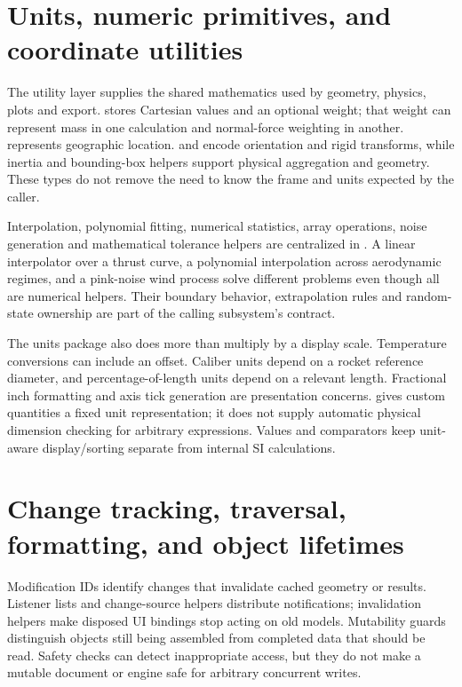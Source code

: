 \section{Units, numeric primitives, and coordinate utilities}
The utility layer supplies the shared mathematics used by geometry, physics, plots and export.  stores Cartesian values and an optional weight; that weight can represent mass in one calculation and normal-force weighting in another.  represents geographic location.  and  encode orientation and rigid transforms, while inertia and bounding-box helpers support physical aggregation and geometry. These types do not remove the need to know the frame and units expected by the caller.

Interpolation, polynomial fitting, numerical statistics, array operations, noise generation and mathematical tolerance helpers are centralized in . A linear interpolator over a thrust curve, a polynomial interpolation across aerodynamic regimes, and a pink-noise wind process solve different problems even though all are numerical helpers. Their boundary behavior, extrapolation rules and random-state ownership are part of the calling subsystem's contract.

The units package also does more than multiply by a display scale. Temperature conversions can include an offset. Caliber units depend on a rocket reference diameter, and percentage-of-length units depend on a relevant length. Fractional inch formatting and axis tick generation are presentation concerns.  gives custom quantities a fixed unit representation; it does not supply automatic physical dimension checking for arbitrary expressions. Values and comparators keep unit-aware display/sorting separate from internal SI calculations.


\section{Change tracking, traversal, formatting, and object lifetimes}
Modification IDs identify changes that invalidate cached geometry or results. Listener lists and change-source helpers distribute notifications; invalidation helpers make disposed UI bindings stop acting on old models. Mutability guards distinguish objects still being assembled from completed data that should be read. Safety checks can detect inappropriate access, but they do not make a mutable document or engine safe for arbitrary concurrent writes.

